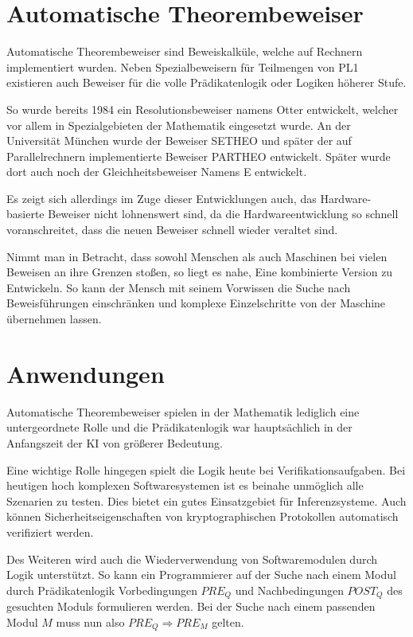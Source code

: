 \section{Automatische Theorembeweiser}
\label{Automatische Theorembeweiser}
Automatische Theorembeweiser sind Beweiskalküle, welche auf Rechnern implementiert wurden. Neben Spezialbeweisern für Teilmengen von PL1 existieren auch Beweiser für die volle Prädikatenlogik oder Logiken höherer Stufe.

So wurde bereits 1984 ein Resolutionsbeweiser namens Otter entwickelt, welcher vor allem in Spezialgebieten der Mathematik eingesetzt wurde.
An der Universität München wurde der Beweiser SETHEO und später der auf Parallelrechnern implementierte Beweiser PARTHEO entwickelt.
Später wurde dort auch noch der Gleichheitsbeweiser Namens E entwickelt.

Es zeigt sich allerdings im Zuge dieser Entwicklungen auch, das Hardware-basierte Beweiser nicht lohnenswert sind, da die Hardwareentwicklung so schnell voranschreitet, dass die neuen Beweiser schnell wieder veraltet sind.

Nimmt man in Betracht, dass sowohl Menschen als auch Maschinen bei vielen Beweisen an ihre Grenzen stoßen, so liegt es nahe, Eine kombinierte Version zu Entwickeln. So kann der Mensch mit seinem Vorwissen die Suche nach Beweisführungen einschränken und komplexe Einzelschritte von der Maschine übernehmen lassen.

\section{Anwendungen}
\label{Anwendung}
Automatische Theorembeweiser spielen in der Mathematik lediglich eine untergeordnete Rolle und die Prädikatenlogik war hauptsächlich in der Anfangszeit der KI von größerer Bedeutung.

Eine wichtige Rolle hingegen spielt die Logik heute bei Verifikationsaufgaben.
Bei heutigen hoch komplexen Softwaresystemen ist es beinahe unmöglich alle Szenarien zu testen. Dies bietet ein gutes Einsatzgebiet für Inferenzsysteme. Auch können Sicherheitseigenschaften von kryptographischen Protokollen automatisch verifiziert werden.

Des Weiteren wird auch die Wiederverwendung von Softwaremodulen durch Logik unterstützt. So kann ein Programmierer auf der Suche nach einem Modul durch Prädikatenlogik Vorbedingungen $PRE_Q$ und Nachbedingungen $POST_Q$ des gesuchten Moduls formulieren werden. Bei der Suche nach einem passenden Modul $M$ muss nun also $PRE_Q \Rightarrow PRE_M$ gelten.

